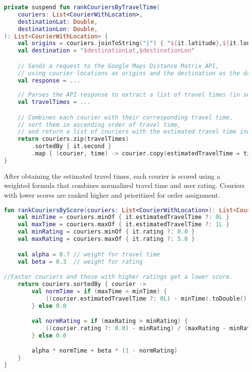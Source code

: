 \begin{lstlisting}[language=Kotlin, caption={Ranking couriers by travel time using Google Maps API}]
private suspend fun rankCouriersByTravelTime(
    couriers: List<CourierWithLocation>,
    destinationLat: Double,
    destinationLon: Double,
): List<CourierWithLocation> {
    val origins = couriers.joinToString("|") { "${it.latitude},${it.longitude}" }
    val destination = "$destinationLat,$destinationLon"

    // Sends a request to the Google Maps Distance Matrix API,
    // using courier locations as origins and the destination as the drop-off point.
    val response = ...
    
    // Parses the API response to extract a list of travel times (in seconds), where each value corresponds to a courier in the original list.
    val travelTimes = ...

    // Combines each courier with their corresponding travel time,
    // sort them in ascending order of travel time,
    // and return a list of couriers with the estimated travel time included.
    return couriers.zip(travelTimes)
        .sortedBy { it.second }
        .map { (courier, time) -> courier.copy(estimatedTravelTime = time) }
}
\end{lstlisting}

After obtaining the estimated travel times, each courier is scored using a weighted formula that combines normalized travel time and user rating. Couriers with lower scores are ranked higher and prioritized for order assignment.

\begin{lstlisting}[language=Kotlin, caption={Scoring couriers by travel time and rating}]
fun rankCouriersByScore(couriers: List<CourierWithLocation>): List<CourierWithLocation> {
    val minTime = couriers.minOf { it.estimatedTravelTime ?: 0L }
    val maxTime = couriers.maxOf { it.estimatedTravelTime ?: 1L }
    val minRating = couriers.minOf { it.rating ?: 0.0 }
    val maxRating = couriers.maxOf { it.rating ?: 5.0 }

    val alpha = 0.7 // weight for travel time
    val beta = 0.3  // weight for rating

//Faster couriers and those with higher ratings get a lower score.
    return couriers.sortedBy { courier ->
        val normTime = if (maxTime > minTime) {
            ((courier.estimatedTravelTime ?: 0L) - minTime).toDouble() / (maxTime - minTime)
        } else 0.0

        val normRating = if (maxRating > minRating) {
            ((courier.rating ?: 0.0) - minRating) / (maxRating - minRating)
        } else 0.0

        alpha * normTime + beta * (1 - normRating)
    }
}
\end{lstlisting}


